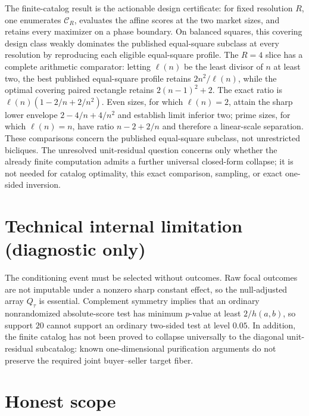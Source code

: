 \documentclass{article}
\begin{document}
The finite-catalog result is the actionable design certificate: for fixed resolution \(R\), one enumerates \(\mathcal C_R\), evaluates the affine scores at the two market sizes, and retains every maximizer on a phase boundary. On balanced squares, this covering design class weakly dominates the published equal-square subclass at every resolution by reproducing each eligible equal-square profile. The \(R=4\) slice has a complete arithmetic comparator: letting \(\ell(n)\) be the least divisor of \(n\) at least two, the best published equal-square profile retains \(2n^2/\ell(n)\), while the optimal covering paired rectangle retains \(2(n-1)^2+2\). The exact ratio is \(\ell(n)(1-2/n+2/n^2)\). Even sizes, for which \(\ell(n)=2\), attain the sharp lower envelope \(2-4/n+4/n^2\) and establish limit inferior two; prime sizes, for which \(\ell(n)=n\), have ratio \(n-2+2/n\) and therefore a linear-scale separation. These comparisons concern the published equal-square subclass, not unrestricted bicliques. The unresolved unit-residual question concerns only whether the already finite computation admits a further universal closed-form collapse; it is not needed for catalog optimality, this exact comparison, sampling, or exact one-sided inversion.

\section*{Technical internal limitation (diagnostic only)}

The conditioning event must be selected without outcomes. Raw focal outcomes are not imputable under a nonzero sharp constant effect, so the null-adjusted array \(Q_\tau\) is essential. Complement symmetry implies that an ordinary nonrandomized absolute-score test has minimum \(p\)-value at least \(2/h(a,b)\), so support \(20\) cannot support an ordinary two-sided test at level \(0.05\). In addition, the finite catalog has not been proved to collapse universally to the diagonal unit-residual subcatalog: known one-dimensional purification arguments do not preserve the required joint buyer--seller target fiber.

\section{Honest scope}
\end{document}

